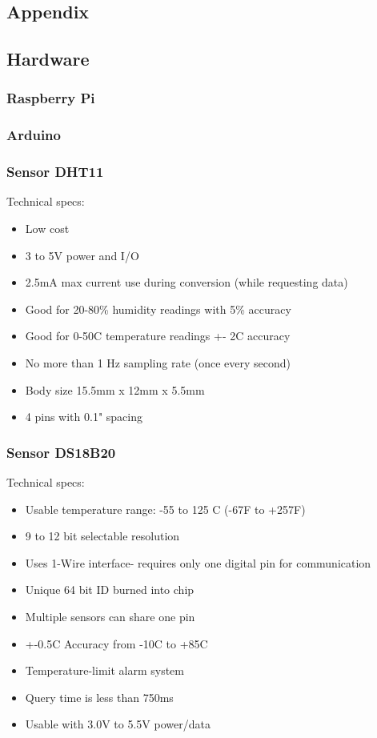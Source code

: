 \documentclass[12pt]{report}
\begin{document}
\begin{appendices}
\chapter{Appendix}
\section{Hardware}
\subsection{Raspberry Pi}
\subsection{Arduino}
\subsection{Sensor DHT11}
Technical specs:
\begin{itemize}
\item Low cost
\item  3 to 5V power and I/O
\item   2.5mA max current use during conversion (while requesting data)
\item  Good for 20-80\% humidity readings with 5\% accuracy
 \item   Good for 0-50C temperature readings +- 2C accuracy
 \item   No more than 1 Hz sampling rate (once every second)
 \item   Body size 15.5mm x 12mm x 5.5mm
 \item   4 pins with 0.1" spacing

    \end{itemize}

\subsection{Sensor DS18B20}
Technical specs:
\begin{itemize}
\item Usable temperature range: -55 to 125 C (-67F to +257F)
\item 9 to 12 bit selectable resolution
\item Uses 1-Wire interface- requires only one digital pin for communication
\item Unique 64 bit ID burned into chip
\item Multiple sensors can share one pin
\item +-0.5C Accuracy from -10C to +85C
\item Temperature-limit alarm system
\item Query time is less than 750ms
\item Usable with 3.0V to 5.5V power/data
\end{itemize}

\end{appendices}
\end{document}
